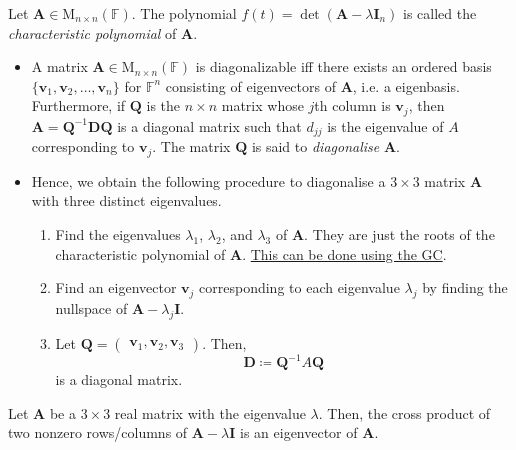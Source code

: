 \documentclass[../Notes.tex]{subfiles}
\begin{document}
\begin{definition}{}{}
    Let \(\mathbf{A}\in \mathrm{M}_{n\times n}(\mathbb{F})\). The polynomial \(f(t)=\det(\mathbf{A}-\lambda \mathbf{I}_n)\) is called the \emph{characteristic polynomial} of \(\mathbf{A}\).
\end{definition}
\begin{stbox}{}
    \begin{itemize}
        \item A matrix \(\mathbf{A}\in\mathrm{M}_{n\times n}(\mathbb{F})\) is diagonalizable iff there exists an ordered basis \(\{\mathbf{v}_1,\mathbf{v}_2,\dots,\mathbf{v}_n\}\) for \(\mathbb{F}^n\) consisting of eigenvectors of \(\mathbf{A}\), i.e. a eigenbasis. Furthermore, if \(\mathbf{Q}\) is the \(n\times n\) matrix whose \(j\)th column is \(\mathbf{v}_j\), then \(\mathbf{A}=\mathbf{Q}^{-1}\mathbf{D}\mathbf{Q}\) is a diagonal matrix such that \(d_{jj}\) is the eigenvalue of \(A\) corresponding to \(\mathbf{v}_j\). The matrix \(\mathbf{Q}\) is said to \emph{diagonalise} \(\mathbf{A}\).
        \item Hence, we obtain the following procedure to diagonalise a \(3\times 3\) matrix \(\mathbf{A}\) with three distinct eigenvalues.
        \begin{enumerate}
            \item Find the eigenvalues \(\lambda_1\), \(\lambda_2\), and \(\lambda_3\) of \(\mathbf{A}\). They are just the roots of the characteristic polynomial of \(\mathbf{A}\). \hyperlink{characteristic-polynomial-roots}{This can be done using the GC}.
            \item Find an eigenvector \(\mathbf{v}_j\) corresponding to each eigenvalue \(\lambda_j\) by finding the nullspace of \(\mathbf{A}-\lambda_j\mathbf{I}
            \).
            \item Let \(\mathbf{Q}=
            \begin{pmatrix}
                \mathbf{v}_1,\mathbf{v}_2,\mathbf{v}_3
            \end{pmatrix}\). Then,
            \[\mathbf{D}\coloneq \mathbf{Q}^{-1}A\mathbf{Q}\]
            is a diagonal matrix.
        \end{enumerate} 
    \end{itemize}    
\end{stbox}
\begin{note}
    Let \(\mathbf{A}\) be a \(3\times 3\) real matrix with the eigenvalue \(\lambda\). Then, the cross product of two nonzero rows/columns of \(\mathbf{A}-\lambda \mathbf{I}\) is an eigenvector of \(\mathbf{A}\).
\end{note}
\end{document}
